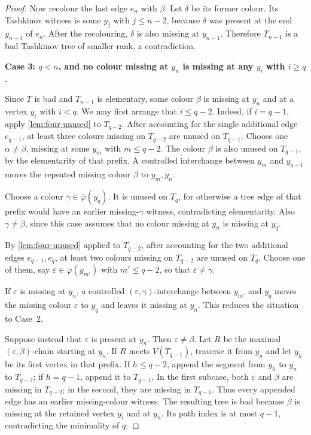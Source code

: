 \documentclass[11pt]{article}
\theoremstyle{definition}
\newcommand{\missing}[1]{\overline{#1}}
\begin{document}
\begin{proof}
Now recolour the last edge $e_n$ with $\beta$.  Let $\delta$ be its former
colour.  Its Tashkinov witness is some $y_j$ with $j\le n-2$, because
$\delta$ was present at the end $y_{n-1}$ of $e_n$.  After the recolouring,
$\delta$ is also missing at $y_{n-1}$.  Therefore $T_{n-1}$ is a bad
Tashkinov tree of smaller rank, a contradiction.

\medskip
\noindent\textbf{Case 3: $q<n$, and no colour missing at $y_n$ is missing at
any $y_i$ with $i\ge q$.}

Since $T$ is bad and $T_{n-1}$ is elementary, some colour $\beta$ is missing at
$y_n$ and at a vertex $y_i$ with $i<q$.  We may first arrange that
$i\le q-2$.  Indeed, if $i=q-1$, apply \cref{lem:four-unused} to $T_{q-2}$.
After accounting for the single additional edge $e_{q-1}$, at least three
colours missing on $T_{q-2}$ are unused on $T_{q-1}$.  Choose one
$\alpha\ne\beta$, missing at some $y_m$ with $m\le q-2$.  The colour $\beta$
is also unused on $T_{q-1}$, by the elementarity of that prefix.  A
controlled interchange between $y_m$ and $y_{q-1}$ moves the repeated missing
colour $\beta$ to $y_m,y_n$.

Choose a colour $\gamma\in\missing\varphi(y_q)$.  It is unused on $T_q$, for
otherwise a tree edge of that prefix would have an earlier missing-$\gamma$
witness, contradicting elementarity.  Also $\gamma\ne\beta$, since this case
assumes that no colour missing at $y_n$ is missing at $y_q$.

By \cref{lem:four-unused} applied to $T_{q-2}$, after accounting for the two
additional edges $e_{q-1},e_q$, at least two colours missing on $T_{q-2}$ are
unused on $T_q$.  Choose one of them, say
$\varepsilon\in\missing\varphi(y_{m'})$ with $m'\le q-2$, so that
$\varepsilon\ne\gamma$.

If $\varepsilon$ is missing at $y_n$, a controlled
$(\varepsilon,\gamma)$-interchange between $y_{m'}$ and $y_q$ moves the
missing colour $\varepsilon$ to $y_q$ and leaves it missing at $y_n$.  This
reduces the situation to Case~2.

Suppose instead that $\varepsilon$ is present at $y_n$.  Then
$\varepsilon\ne\beta$.  Let $R$ be the maximal
$(\varepsilon,\beta)$-chain starting at $y_n$.  If $R$ meets
$V(T_{q-1})$, traverse it from $y_n$ and let $y_h$ be its first vertex in that
prefix.  If $h\le q-2$, append the segment from $y_h$ to $y_n$ to
$T_{q-2}$; if $h=q-1$, append it to $T_{q-1}$.  In the first subcase, both
$\varepsilon$ and $\beta$ are missing in $T_{q-2}$; in the second, they are
missing in $T_{q-1}$.  Thus every appended edge has an earlier missing-colour
witness.  The resulting tree is bad because $\beta$ is missing at the retained
vertex $y_i$ and at $y_n$.  Its path index is at most $q-1$, contradicting the
minimality of $q$.


\end{proof}
\end{document}
